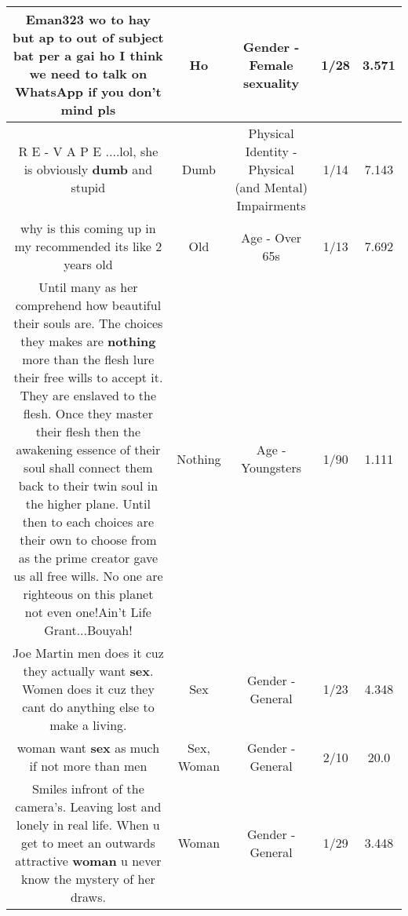 \documentclass[11pt]{article}
\newlength\mylength
\begin{document}
\begin{center}
\begin{longtable}{|C{.65\mylength}|C{.30\mylength}|C{.12\mylength}|C{.12\mylength}|C{.12\mylength}|}
  \small Eman323 wo to hay but ap to out of subject bat per a gai \textbf{ho} I think we need to talk on WhatsApp if you don't mind pls\normalsize   & Ho & Gender - Female sexuality & 1/28 & 3.571 \\  \hline
  \small R E - V A P E ....lol, she is obviously \textbf{dumb} and stupid\normalsize   & Dumb & Physical Identity - Physical (and Mental) Impairments & 1/14 & 7.143 \\  \hline
  \small why is this coming up in my recommended its like 2 years old\normalsize   & Old & Age - Over 65s & 1/13 & 7.692 \\  \hline
  \small Until many as her comprehend how beautiful their souls are.  The choices they makes are \textbf{nothing} more than the flesh lure their free wills to accept it. They are enslaved to the flesh. Once they master their flesh then the awakening essence of their soul shall connect them back to their twin soul in the higher plane. Until then to each choices are their own to choose from as the prime creator gave us all free wills. No one are righteous on this planet not even one!Ain't Life Grant...Bouyah!\normalsize   & Nothing & Age - Youngsters & 1/90 & 1.111 \\  \hline
  \small Joe Martin men does it cuz they actually want \textbf{sex}. Women does it cuz they cant do anything else to make a living.\normalsize   & Sex & Gender - General & 1/23 & 4.348 \\  \hline
  \small woman want \textbf{sex} as much if not more than men\normalsize   & Sex, Woman & Gender - General & 2/10 & 20.0 \\  \hline
  \small Smiles infront of the camera's. Leaving lost and lonely in real life. When u get to meet an outwards attractive \textbf{woman} u never know the mystery of her draws.\normalsize   & Woman & Gender - General & 1/29 & 3.448 \\  \hline

\end{longtable}
\end{center}
\end{document}
